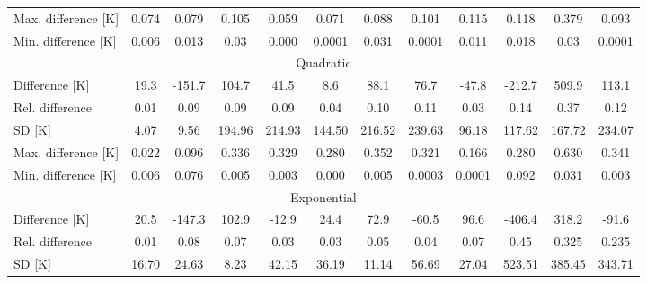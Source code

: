 {\begin{table}
\begin{tabular}{lccccccccccc}
        Max. difference {[}K{]} & 0.074                          & 0.079                         & 0.105   & 0.059   & 0.071   & 0.088   & 0.101   & 0.115   & 0.118   & 0.379   & 0.093   \\
        Min. difference {[}K{]} & 0.006                          & 0.013                         & 0.03    & 0.000   & 0.0001  & 0.031   & 0.0001  & 0.011   & 0.018   & 0.03    & 0.0001  \\ \hline
        \multicolumn{12}{c}{Quadratic}                                                                                                                                                 \\ \hline
        Difference {[}K{]}      & 19.3                           & -151.7                        & 104.7   & 41.5    & 8.6     & 88.1    & 76.7    & -47.8   & -212.7  & 509.9   & 113.1   \\
        Rel. difference         & 0.01                           & 0.09                          & 0.09    & 0.09    & 0.04    & 0.10    & 0.11    & 0.03    & 0.14    & 0.37    & 0.12    \\
        SD {[}K{]}              & 4.07                           & 9.56                          & 194.96  & 214.93  & 144.50  & 216.52  & 239.63  & 96.18   & 117.62  & 167.72  & 234.07  \\
        Max. difference {[}K{]} & 0.022                          & 0.096                         & 0.336   & 0.329   & 0.280   & 0.352   & 0.321   & 0.166   & 0.280   & 0.630   & 0.341   \\
        Min. difference {[}K{]} & 0.006                          & 0.076                         & 0.005   & 0.003   & 0.000   & 0.005   & 0.0003  & 0.0001  & 0.092   & 0.031   & 0.003   \\ \hline
        \multicolumn{12}{c}{Exponential}                                                                                                                                                   \\ \hline
        Difference {[}K{]}      & 20.5                           & -147.3                        & 102.9   & -12.9   & 24.4    & 72.9    & -60.5   & 96.6    & -406.4  & 318.2   & -91.6   \\
        Rel. difference         & 0.01                           & 0.08                          & 0.07    & 0.03    & 0.03    & 0.05    & 0.04    & 0.07    & 0.45    & 0.325   & 0.235    \\
        SD {[}K{]}              & 16.70                          & 24.63                         & 8.23    & 42.15   & 36.19   & 11.14   & 56.69   & 27.04   & 523.51  & 385.45  & 343.71  \\

\end{tabular}
\end{table}}
